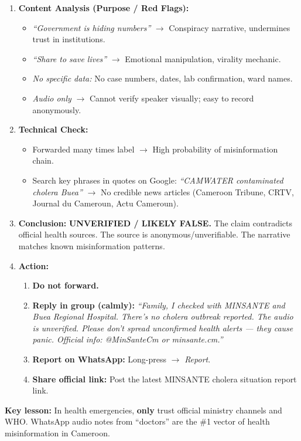 \documentclass[11pt]{article}
\begin{document}
\begin{exoresolu}
\begin{enumerate}
\begin{itemize}
              \end{itemize}
        \item \textbf{Content Analysis (Purpose / Red Flags):}
              \begin{itemize}
                  \item \textit{``Government is hiding numbers''} $\rightarrow$ Conspiracy narrative, undermines trust in institutions.
                  \item \textit{``Share to save lives''} $\rightarrow$ Emotional manipulation, virality mechanic.
                  \item \textit{No specific data:} No case numbers, dates, lab confirmation, ward names.
                  \item \textit{Audio only} $\rightarrow$ Cannot verify speaker visually; easy to record anonymously.
              \end{itemize}
        \item \textbf{Technical Check:}
              \begin{itemize}
                  \item Forwarded many times label $\rightarrow$ High probability of misinformation chain.
                  \item Search key phrases in quotes on Google: \textit{``CAMWATER contaminated cholera Buea''} $\rightarrow$ No credible news articles (Cameroon Tribune, CRTV, Journal du Cameroun, Actu Cameroun).
              \end{itemize}
        \item \textbf{Conclusion:} \textbf{UNVERIFIED / LIKELY FALSE.} The claim contradicts official health sources. The source is anonymous/unverifiable. The narrative matches known misinformation patterns.
        \item \textbf{Action:}
              \begin{enumerate}
                  \item \textbf{Do not forward.}
                  \item \textbf{Reply in group (calmly):} \textit{``Family, I checked with MINSANTE and Buea Regional Hospital. There's no cholera outbreak reported. The audio is unverified. Please don't spread unconfirmed health alerts — they cause panic. Official info: @MinSanteCm or minsante.cm.''}
                  \item \textbf{Report on WhatsApp:} Long-press $\rightarrow$ \textit{Report}.
                  \item \textbf{Share official link:} Post the latest MINSANTE cholera situation report link.
              \end{enumerate}
    \end{enumerate}
    \textbf{Key lesson:} In health emergencies, \textbf{only} trust official ministry channels and WHO. WhatsApp audio notes from ``doctors'' are the \#1 vector of health misinformation in Cameroon.
\end{exoresolu}
\end{document}
